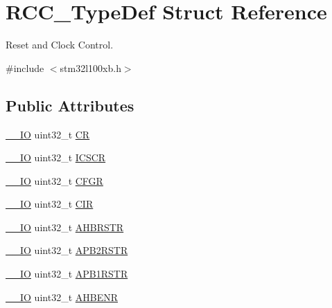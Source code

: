 \hypertarget{struct_r_c_c___type_def}{\section{R\-C\-C\-\_\-\-Type\-Def Struct Reference}
\label{struct_r_c_c___type_def}
}


Reset and Clock Control.  




{\ttfamily \#include $<$stm32l100xb.\-h$>$}

\subsection*{Public Attributes}
\begin{DoxyCompactItemize}
\item 
\hyperlink{core__sc300_8h_aec43007d9998a0a0e01faede4133d6be}{\-\_\-\-\_\-\-I\-O} uint32\-\_\-t \hyperlink{struct_r_c_c___type_def_abcb9ff48b9afb990283fefad0554b5b3}{C\-R}
\item 
\hyperlink{core__sc300_8h_aec43007d9998a0a0e01faede4133d6be}{\-\_\-\-\_\-\-I\-O} uint32\-\_\-t \hyperlink{struct_r_c_c___type_def_a5aa77c68f2409fff241e949f3d6129b5}{I\-C\-S\-C\-R}
\item 
\hyperlink{core__sc300_8h_aec43007d9998a0a0e01faede4133d6be}{\-\_\-\-\_\-\-I\-O} uint32\-\_\-t \hyperlink{struct_r_c_c___type_def_a0721b1b729c313211126709559fad371}{C\-F\-G\-R}
\item 
\hyperlink{core__sc300_8h_aec43007d9998a0a0e01faede4133d6be}{\-\_\-\-\_\-\-I\-O} uint32\-\_\-t \hyperlink{struct_r_c_c___type_def_aeadf3a69dd5795db4638f71938704ff0}{C\-I\-R}
\item 
\hyperlink{core__sc300_8h_aec43007d9998a0a0e01faede4133d6be}{\-\_\-\-\_\-\-I\-O} uint32\-\_\-t \hyperlink{struct_r_c_c___type_def_a46a098b026c5e85770e7a7f05a35d49c}{A\-H\-B\-R\-S\-T\-R}
\item 
\hyperlink{core__sc300_8h_aec43007d9998a0a0e01faede4133d6be}{\-\_\-\-\_\-\-I\-O} uint32\-\_\-t \hyperlink{struct_r_c_c___type_def_a4491ab20a44b70bf7abd247791676a59}{A\-P\-B2\-R\-S\-T\-R}
\item 
\hyperlink{core__sc300_8h_aec43007d9998a0a0e01faede4133d6be}{\-\_\-\-\_\-\-I\-O} uint32\-\_\-t \hyperlink{struct_r_c_c___type_def_a600f4d6d592f43edb2fc653c5cba023a}{A\-P\-B1\-R\-S\-T\-R}
\item 
\hyperlink{core__sc300_8h_aec43007d9998a0a0e01faede4133d6be}{\-\_\-\-\_\-\-I\-O} uint32\-\_\-t \hyperlink{struct_r_c_c___type_def_abaebc9204bbc1708356435a5a01e70eb}{A\-H\-B\-E\-N\-R}

\end{DoxyCompactItemize}
